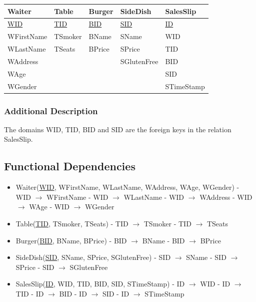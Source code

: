 \documentclass[10pt, a4paper]{article}
\begin{document}
\begin{tabular}[ht]{| p{2.8cm} | p{2.8cm} | p{2.8cm} | p{2.8cm} | p{2.8cm} |}
\hline
  	Waiter 			& Table 			& Burger			& SideDish 		& SalesSlip\\
\hline\hline
	\underline{WID}	& \underline{TID}     	& \underline{BID}	& \underline{SID}	& \underline{ID}\\
	WFirstName		& TSmoker     		& BName			& SName			& WID\\
	WLastName		& TSeats     		& BPrice			& SPrice			& TID\\
	WAddress			& 		     		&				& SGlutenFree		& BID\\
	WAge			& 		     		&				& 				& SID\\
	WGender			& 		     		&				& 				& STimeStamp\\
\hline
\end{tabular}

\subsubsection{Additional Description}

The domains WID, TID, BID and SID are the foreign keys in the relation SalesSlip.

\subsection{Functional Dependencies}

\begin{itemize}
	\item Waiter(\underline{WID}, WFirstName, WLastName, WAddress, WAge, WGender)
		\subitem - WID $\rightarrow$ WFirstName
		\subitem - WID $\rightarrow$ WLastName
		\subitem - WID $\rightarrow$ WAddress
		\subitem - WID $\rightarrow$ WAge
		\subitem - WID $\rightarrow$ WGender
	\item Table(\underline{TID}, TSmoker, TSeats)
		\subitem - TID $\rightarrow$ TSmoker
		\subitem - TID $\rightarrow$ TSeats
		
	\pagebreak	
	
	\item Burger(\underline{BID}, BName, BPrice)
		\subitem - 	BID $\rightarrow$ BName
		\subitem - 	BID $\rightarrow$ BPrice
	\item SideDish(\underline{SID}, SName, SPrice, SGlutenFree)
		\subitem - SID $\rightarrow$ SName
		\subitem - SID $\rightarrow$ SPrice
		\subitem - SID $\rightarrow$ SGlutenFree
	\item SalesSlip(\underline{ID}, WID, TID, BID, SID, STimeStamp)
		\subitem - ID $\rightarrow$ WID
		\subitem - ID $\rightarrow$ TID
		\subitem - ID $\rightarrow$ BID
		\subitem - ID $\rightarrow$ SID
		\subitem - ID $\rightarrow$ STimeStamp	
\end{itemize}
\end{document}
